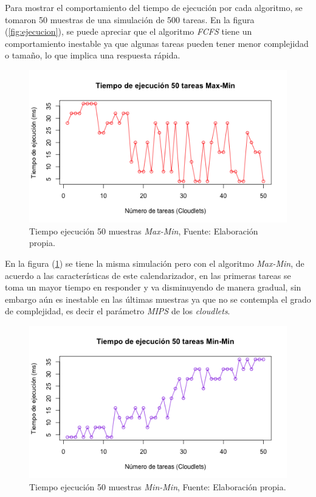 Para mostrar el comportamiento del tiempo de ejecuci\'on por cada algoritmo, se tomaron 50 muestras de una simulaci\'on de 500 tareas. En la figura (\ref{fig:ejecucion}), se puede apreciar que el algoritmo \textit{FCFS} tiene un comportamiento inestable ya que algunas tareas pueden tener menor complejidad o tamaño, lo que implica una respuesta r\'apida.

\newpage

\setcounter{figure}{20}
\renewcommand\thefigure{\arabic{figure}}
\begin{figure}[h!] 
	\centering
	\includegraphics[scale=0.6]{media/maxmin}
	\caption{Tiempo ejecuci\'on 50 muestras \textit{Max-Min}, Fuente: Elaboraci\'on propia.}
	\label{fig:maxmin}
\end{figure}


 En la figura (\ref{fig:maxmin}) se tiene la misma simulaci\'on pero con el algoritmo \textit{Max-Min}, de acuerdo a las caracter\'isticas de este calendarizador, en las primeras tareas se toma un mayor tiempo en responder y va disminuyendo de manera gradual, sin embargo a\'un es inestable en las \'ultimas muestras ya que no se contempla el grado de complejidad, es decir el par\'ametro \textit{MIPS} de los \textit{cloudlets}.



\newpage
\setcounter{figure}{21}
\renewcommand\thefigure{\arabic{figure}}
\begin{figure}[h!] 
	\centering
	\includegraphics[scale=0.6]{media/minmin}
	\caption{Tiempo ejecuci\'on 50 muestras \textit{Min-Min}, Fuente: Elaboraci\'on propia.}
	\label{fig:minmin}
\end{figure}

